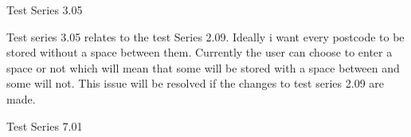 \begin{flushleft}
Test Series 3.05

Test series 3.05 relates to the test Series 2.09. Ideally i want every postcode to be stored without a space between them. Currently the user can choose to enter a space or not which will mean that some will be stored with a space between and some will not. This issue will be resolved if the changes to test series 2.09 are made.

Test Series 7.01












































\end{flushleft}